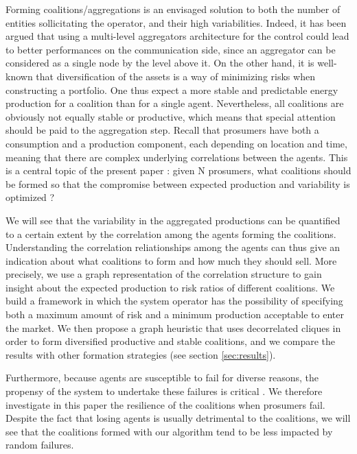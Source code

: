 \documentclass[conference]{IEEEtran}
\begin{document}
Forming coalitions/aggregations is an envisaged solution to both the number of entities sollicitating the operator, and their high variabilities. Indeed, it has been argued that using a multi-level aggregators architecture for the control could lead to better performances on the communication side, since an aggregator can be considered as a single node by the level above it. On the other hand, it is well-known that diversification of the assets is a way of minimizing risks when constructing a portfolio. One thus expect a more stable and predictable energy production for a coalition than for a single agent. Nevertheless, all coalitions are obviously not equally stable or productive, which means that special attention should be paid to the aggregation step. Recall that prosumers have both a consumption and a production component, each depending on location and time, meaning that there are complex underlying correlations between the agents. This is a central topic of the present paper : given N prosumers, what coalitions should be formed so that the compromise between expected production and variability is optimized ?

We will see that the variability in the aggregated productions can be quantified to a certain extent by the correlation among the agents forming the coalitions. Understanding the correlation reliationships among the agents can thus give an indication about what coalitions to form and how much they should sell. More precisely, we use a graph representation of the correlation structure to gain insight about the expected production to risk ratios of different coalitions. We build a framework in which the system operator has the possibility of specifying both a maximum amount of risk and a minimum production acceptable to enter the market. We then propose a graph heuristic that uses decorrelated cliques in order to form diversified productive and stable coalitions, and we compare the results with other formation strategies (see section \ref{sec:results}). 

Furthermore, because agents are susceptible to fail for diverse reasons, the propensy of the system to undertake these failures is critical \cite{Pahwa}. We therefore investigate in this paper the resilience of the coalitions when prosumers fail. Despite the fact that losing agents is usually detrimental to the coalitions, we will see that the coalitions formed with our algorithm tend to be less impacted by random failures.
\end{document}
